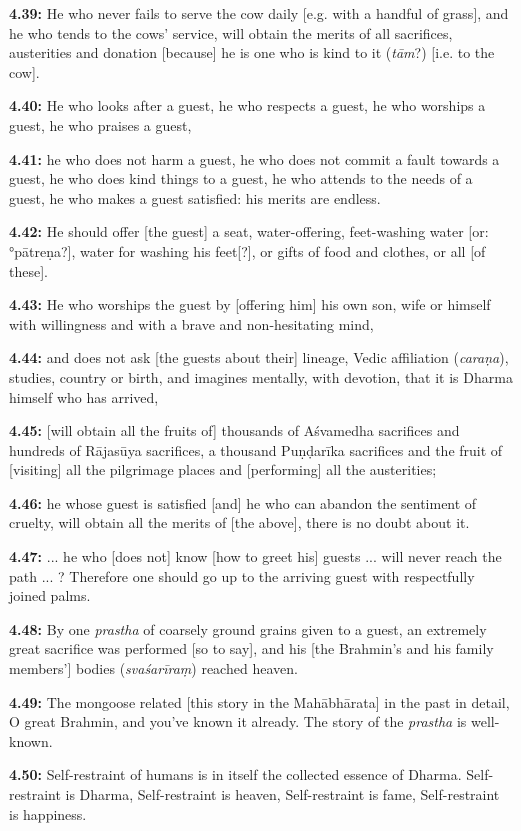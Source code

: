 \documentclass{article}
\newcommand{\vsnum}[1]{\textbf{#1}}
\newcommand{\skt}[1]{\textit{#1}}
\begin{document}
\vsnum{4.39: }He who never fails to serve the cow daily [e.g. with a handful of grass], and he who tends to the cows' service, will obtain the merits of all sacrifices, austerities and donation [because] he is one who is kind to it (\skt{tām}?) [i.e. to the cow].

\vsnum{4.40: }He who looks after a guest, he who respects a guest, he who worships a guest, he who praises a guest,

\vsnum{4.41: }he who does not harm a guest, he who does not commit a fault towards a guest, he who does kind things to a guest, he who attends to the needs of a guest, he who makes a guest satisfied: his merits are endless.

\vsnum{4.42: }He should offer [the guest] a seat, water-offering, feet-washing water [or: °pātreṇa?], water for washing his feet[?], or gifts of food and clothes, or all [of these].

\vsnum{4.43: }He who worships the guest by [offering him] his own son, wife or himself with willingness and with a brave and non-hesitating mind,

\vsnum{4.44: }and does not ask [the guests about their] lineage, Vedic affiliation (\skt{caraṇa}), studies, country or birth, and imagines mentally, with devotion, that it is Dharma himself who has arrived,

\vsnum{4.45: }[will obtain all the fruits of] thousands of Aśvamedha sacrifices and hundreds of Rājasūya sacrifices, a thousand Puṇḍarīka sacrifices and the fruit of [visiting] all the pilgrimage places and [performing] all the austerities;

\vsnum{4.46: }he whose guest is satisfied [and] he who can abandon the sentiment of cruelty, will obtain all the merits of [the above], there is no doubt about it.

\vsnum{4.47: }... he who [does not] know [how to greet his] guests ... will never reach the path ... ? Therefore one should go up to the arriving guest with respectfully joined palms.

\vsnum{4.48: }By one \skt{prastha} of coarsely ground grains given to a guest, an extremely great sacrifice was performed [so to say], and his [the Brahmin's and his family members'] bodies (\skt{svaśarīraṃ}) reached heaven.

\vsnum{4.49: }The mongoose related [this story in the Mahābhārata] in the past in detail, O great Brahmin, and you've known it already. The story of the \skt{prastha} is well-known.

\vsnum{4.50: }Self-restraint of humans is in itself the collected essence of Dharma. Self-restraint is Dharma, Self-restraint is heaven, Self-restraint is fame, Self-restraint is happiness.
\end{document}
